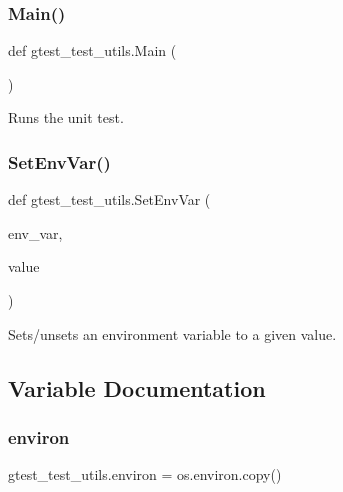 \subsubsection{\texorpdfstring{Main()}{Main()}}
{\footnotesize\ttfamily def gtest\+\_\+test\+\_\+utils.\+Main (\begin{DoxyParamCaption}{ }\end{DoxyParamCaption})}

\begin{DoxyVerb}Runs the unit test.\end{DoxyVerb}
 \mbox{\label{namespacegtest__test__utils_a616ee0f04e98e54b128cbe492def9bb1}} 
\subsubsection{\texorpdfstring{SetEnvVar()}{SetEnvVar()}}
{\footnotesize\ttfamily def gtest\+\_\+test\+\_\+utils.\+Set\+Env\+Var (\begin{DoxyParamCaption}\item[{}]{env\+\_\+var,  }\item[{}]{value }\end{DoxyParamCaption})}

\begin{DoxyVerb}Sets/unsets an environment variable to a given value.\end{DoxyVerb}
 

\subsection{Variable Documentation}
\mbox{\label{namespacegtest__test__utils_ab0f2d4a3e90400abb93fd0808047a0a4}} 
\subsubsection{\texorpdfstring{environ}{environ}}
{\footnotesize\ttfamily gtest\+\_\+test\+\_\+utils.\+environ = os.\+environ.\+copy()}

\mbox{\label{namespacegtest__test__utils_aeb3755b4dd33aabe1baee781fecc1e66}} 
